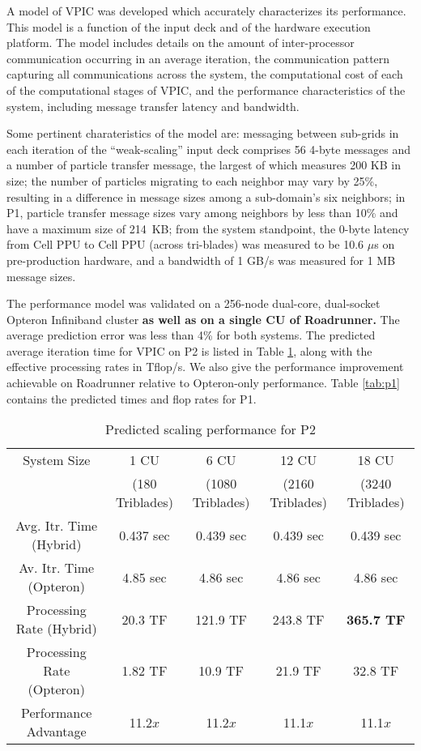 \documentclass[letter,10pt]{article}
\begin{document}
A model of VPIC was developed which accurately characterizes its performance. 
This model is a function of the input deck and of the hardware execution 
platform.  
The model includes 
details on the amount of inter-processor communication occurring in an 
average iteration, the communication pattern capturing all communications 
across the system, the computational cost of each of the computational 
stages of VPIC, and the performance  characteristics of the system, 
including message transfer latency and bandwidth. 

Some pertinent charateristics of the model are:  
messaging between sub-grids in each 
iteration of the ``weak-scaling'' input deck comprises 56 4-byte messages 
and a number of particle transfer message, the largest of which measures 
200 KB in size; the number of particles migrating to each neighbor may 
vary by 25\%, resulting in a difference in message sizes among a 
sub-domain's six neighbors; in P1, particle transfer 
message sizes vary among neighbors by less than 10\% and have a maximum 
size of 214~KB; from the system standpoint, the 0-byte latency from Cell 
PPU to Cell PPU (across tri-blades) was measured to be 10.6 $\mu$s on 
pre-production hardware, and a bandwidth of 1 GB/s was measured for 
1 MB message sizes. 

The performance model was validated on a 256-node dual-core, dual-socket 
Opteron Infiniband cluster \textbf{as well as on a single CU of Roadrunner.}  
The average prediction error was less than 4\% for both systems.  The 
predicted average iteration time for VPIC on P2 
is listed in Table \ref{tab:p2}, along with the effective processing rates 
in Tflop/s.  We also give the performance improvement achievable on 
Roadrunner relative to Opteron-only performance.  Table 
\ref{tab:p1} contains the predicted times and flop rates for P1. 

\begin{table}
\begin{center}
\begin{tabular}{c c c c c}
\hline
\hline
 System Size & 1 CU & 6 CU & 12 CU & 18 CU \\
             & (180 Triblades) & (1080 Triblades) & (2160 Triblades) & (3240 Triblades) \\
\hline
Avg. Itr. Time (Hybrid) & 0.437 sec & 0.439 sec & 0.439 sec & 0.439 sec \\
Av. Itr. Time (Opteron) & 4.85 sec & 4.86 sec & 4.86 sec & 4.86 sec \\
Processing Rate (Hybrid) & 20.3 TF & 121.9 TF & 243.8 TF & \textbf{365.7 TF} \\
Processing Rate (Opteron) & 1.82 TF & 10.9 TF & 21.9 TF & 32.8 TF \\
Performance Advantage & 11.2$x$ & 11.2$x$ & 11.1$x$ & 11.1$x$ \\
\hline
\end{tabular}
\end{center}
\caption{Predicted scaling performance for P2}
\label{tab:p2}
\end{table}
\end{document}
